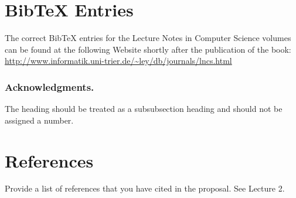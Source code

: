 \documentclass[runningheads,a4paper]{llncs}
\begin{document}
\section{BibTeX Entries}

The correct BibTeX entries for the Lecture Notes in Computer Science
volumes can be found at the following Website shortly after the
publication of the book:
\url{http://www.informatik.uni-trier.de/~ley/db/journals/lncs.html}

\subsubsection*{Acknowledgments.} The heading should be treated as a
subsubsection heading and should not be assigned a number.

\section{References}\label{references}

Provide a list of references that you have cited in the proposal. See Lecture 2.\\



\end{document}
